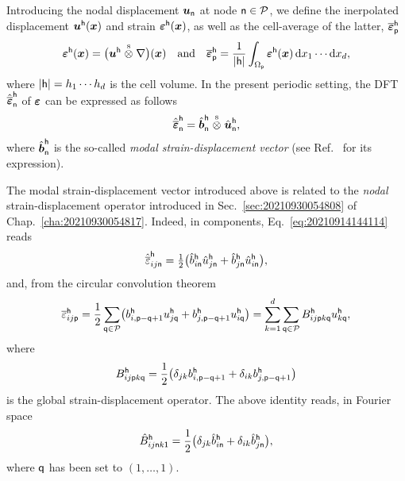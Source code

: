 Introducing the nodal displacement \(\boldsymbol u_\mathsf{n}\) at node
\(\mathsf{n}\in\mathcal{P}\), we define the inerpolated displacement
\(\boldsymbol u^\mathsf{h}(\boldsymbol x)\) and strain \(\boldsymbol{\boldsymbol{\varepsilon}}^\mathsf{h}(\boldsymbol x)\), as
well as the cell-average of the latter,
\(\overline{\boldsymbol{\boldsymbol{\varepsilon}}}_\mathsf{p}^\mathsf{h}\)
\begin{equation}
  \boldsymbol\varepsilon^\mathsf{h}(\boldsymbol x)=\bigl(\boldsymbol
  u^\mathsf{h}\stackrel{\mathrm{s}}{\otimes}\nabla\bigr)(\boldsymbol x)
  \quad\text{and}\quad
  \overline{\boldsymbol\varepsilon}_\mathsf{p}^\mathsf{h}
  =\frac1{\lvert\mathsf{h}\rvert}\int_{\Omega_\mathsf{p}}\boldsymbol{\boldsymbol{\varepsilon}}^\mathsf{h}(\boldsymbol x)
  \,\mathrm d x_1\cdots\mathrm d x_d,
\end{equation}
where \(|\mathsf{h}|=h_1\cdots h_d\) is the cell volume. In the present periodic
setting, the DFT \(\hat{\overline{\boldsymbol\varepsilon}}_\mathsf{n}^\mathsf{h}\) of
\(\boldsymbol\varepsilon\) can be expressed as follows
\begin{equation}
  \label{eq:20210914144114}
  \hat{\overline{\boldsymbol\varepsilon}}_\mathsf{n}^\mathsf{h}
  =\hat{\boldsymbol b}_\mathsf{n}^\mathsf{h}\stackrel{\mathrm{s}}{\otimes}\hat{\boldsymbol u}_\mathsf{n}^\mathsf{h},
\end{equation}
where \(\hat{\boldsymbol b}_\mathsf{n}^\mathsf{h}\) is the so-called \emph{modal
  strain-displacement vector} (see Ref.~\cite{bris2017} for its expression).

The modal strain-displacement vector introduced above is related to the
\emph{nodal} strain-displacement operator introduced in
Sec.~\ref{sec:20210930054808} of Chap.~\ref{cha:20210930054817}. Indeed, in
components, Eq.~\eqref{eq:20210914144114} reads
\begin{equation}
  \hat{\overline{\varepsilon}}_{ij\mathsf{n}}^\mathsf{h}
  =\tfrac12\bigl(\hat{b}_{i\mathsf{n}}^\mathsf{h}\hat{u}_{j\mathsf{n}}^\mathsf{h}
  +\hat{b}_{j\mathsf{n}}^\mathsf{h}\hat{u}_{i\mathsf{n}}^\mathsf{h}\bigr),
\end{equation}
and, from the circular convolution theorem
\begin{equation}
  \overline{\varepsilon}_{ij\mathsf{p}}^\mathsf{h}
  =\frac12\sum_{\mathsf{q}\in\mathcal{P}}\bigl(
  b_{i,\mathsf{p}-\mathsf{q}+1}^\mathsf{h}u_{j\mathsf{q}}^\mathsf{h}
  +b_{j,\mathsf{p}-\mathsf{q}+1}^\mathsf{h}u_{i\mathsf{q}}^\mathsf{h}\bigr)
  =\sum_{k=1}^d\sum_{\mathsf{q}\in\mathcal{P}}B_{ij\mathsf{p}k\mathsf{q}}^\mathsf{h}
  u_{k\mathsf{q}}^\mathsf{h},
\end{equation}
where
\begin{equation}
  B_{ij\mathsf{p}k\mathsf{q}}^\mathsf{h}
  =\frac12\bigl(\delta_{jk}b_{i,\mathsf{p}-\mathsf{q}+1}^\mathsf{h}
  +\delta_{ik}b_{j,\mathsf{p}-\mathsf{q}+1}^\mathsf{h}\bigr)
\end{equation}
is the global strain-displacement operator. The above identity reads, in Fourier
space
\begin{equation}
  \hat{B}_{ij\mathsf{n}k\mathsf{1}}^\mathsf{h}
  =\frac12\bigl(\delta_{jk}\hat{b}_{i\mathsf{n}}^\mathsf{h}
  +\delta_{ik}\hat{b}_{j\mathsf{n}}^\mathsf{h}\bigr),
\end{equation}
where \(\mathsf{q}\) has been set to \((1, \ldots, 1)\).

